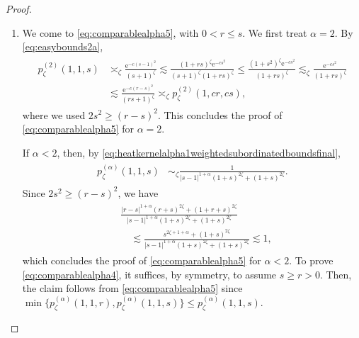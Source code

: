 \documentclass[12pt,reqno,a4paper]{amsart}
\theoremstyle{definition}
\theoremstyle{remark}
\numberwithin{equation}{section}
\newcommand{\1}{\mathbbm{1}}
\newcommand{\me}[1]{\mathrm{e}^{#1}}
\begin{document}
\begin{proof}
\begin{enumerate}
    \smallskip
  \item We come to \eqref{eq:comparablealpha5}, with %
    $0<r\leq s$.
    We first treat $\alpha=2$. By \eqref{eq:easybounds2a},
    \begin{align}
      \begin{split}
        p_\zeta^{(2)}(1,1,s)
        & \asymp_{\zeta} \frac{\me{-c(s-1)^2}}{(s+1)^\zeta}
          \lesssim \frac{(1+rs)^\zeta \me{-cs^2}}{(s+1)^\zeta (1+rs)^\zeta}
          \leq \frac{(1+s^2)^\zeta \me{-cs^2}}{(1+rs)^\zeta}
          \lesssim_\zeta \frac{\me{-cs^2}}{(1+rs)^\zeta} \\
        & \lesssim \frac{\me{-c(r-s)^2}}{(rs+1)^\zeta}
          \asymp_{\zeta} p_\zeta^{(2)}(1,cr,cs),
      \end{split}
    \end{align}
    where we used $2s^2\geq (r-s)^2$. This concludes the proof of \eqref{eq:comparablealpha5} for $\alpha=2$.
    
    If $\alpha<2$, then, by \eqref{eq:heatkernelalpha1weightedsubordinatedboundsfinal},
    \begin{align}
      \begin{split}
        p_\zeta^{(\alpha)}(1,1,s)
        & \sim_{\zeta} \frac{1}{|s-1|^{1+\alpha}(1+s)^{2\zeta} + (1+s)^{2\zeta}}.
      \end{split}
    \end{align}
    Since $2s^2\geq (r-s)^2$, we have
    \begin{align}
      \begin{split}
        & \frac{|r-s|^{1+\alpha}(r+s)^{2\zeta} + (1+r+s)^{2\zeta}}{|s-1|^{1+\alpha}(1+s)^{2\zeta} + (1+s)^{2\zeta}} \\
        & \quad \lesssim \frac{s^{2\zeta+1+\alpha} + (1+s)^{2\zeta}}{|s-1|^{1+\alpha}(1+s)^{2\zeta} + (1+s)^{2\zeta}}
        \lesssim 1,
      \end{split}
    \end{align}
    which concludes the proof of \eqref{eq:comparablealpha5} for $\alpha<2$.
    To prove \eqref{eq:comparablealpha4}, it suffices, by
    symmetry, to assume $s\geq r>0$. Then, the claim follows from \eqref{eq:comparablealpha5} since $\min\{p_\zeta^{(\alpha)}(1,1,r),p_\zeta^{(\alpha)}(1,1,s)\} \leq p_\zeta^{(\alpha)}(1,1,s)$.
    

\end{enumerate}
\end{proof}
\end{document}
